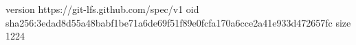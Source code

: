 version https://git-lfs.github.com/spec/v1
oid sha256:3edad8d55a48babf1be71a6de69f51f89e0fcfa170a6cce2a41e933d472657fc
size 1224
